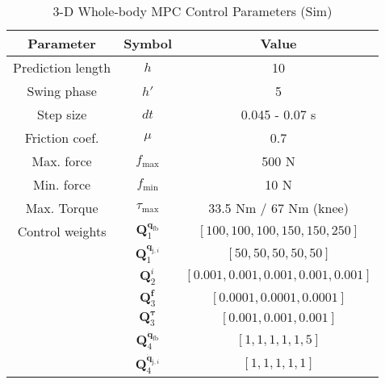
\begin{table}[H]
	\vspace{0.2cm}
	\centering
	\caption{3-D Whole-body MPC Control Parameters (Sim)}
	\begin{tabular}{ccc}
	\hline
	Parameter & Symbol & Value \\
	\hline
	Prediction length & $h$  &  10 \\
        Swing phase & $h'$ & 5 \\
        Step size & $dt$  &  0.045 - 0.07 s \\
        Friction coef. & $\mu$  &  0.7 \\
        Max. force & $f_\text{max}$  &  500 N \\
        Min. force & $f_\text{min}$  &  10 N \\
        Max. Torque & $\tau_\text{max}$ & 33.5 Nm / 67 Nm (knee)\\
        Control weights & $\bm Q_1^{\bm q_\text{fb}}$  &  $[100, 100, 100, 150, 150, 250]$ \\
        & $\bm Q_1^{\bm q_{\text{j},i}}$  &  $[50,50,50,50,50]$ \\
        & $\bm Q_2^{i}$ & $[0.001, 0.001, 0.001, 0.001, 0.001]$ \\
        & $\bm Q_3^{\bm f}$ & $[0.0001, 0.0001, 0.0001]$ \\
        & $\bm Q_3^{\bm \tau}$ & $[0.001, 0.001, 0.001]$ \\
        & $\bm Q_4^{\dot{\bm q}_\text{fb}}$  &  $[1, 1, 1, 1, 1, 5]$ \\
        & $\bm Q_4^{\dot{\bm q}_{\text{j},i}}$  &  $[1,1,1,1,1]$ \\
	\hline 
	\end{tabular}
	\vspace{0.2cm}
\end{table}	

